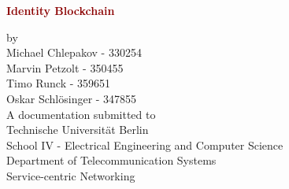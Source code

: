\begin{titlepage}
	\strut
	\hfill
	\begin{center}
	\vspace{1cm}
		\Huge
		\begin{spacing}{.9}
			\textcolor{DarkRed}{\textbf{Identity Blockchain}}\\
		\end{spacing}
		\vspace{0.8cm}
		\large
		by\\
		\vspace{0.8cm}
		Michael Chlepakov - 330254 \\
		Marvin Petzolt - 350455 \\
		Timo Runck - 359651 \\
		Oskar Schl{\"o}singer - 347855 \\
		\vspace{2cm}
	 	A documentation submitted to\\
		\vspace{0.5cm}
		Technische Universität Berlin\\
		School IV - Electrical Engineering and Computer Science\\
		Department of Telecommunication Systems\\
		Service-centric Networking\\
		\vspace{0.5cm}

\end{center}
\end{titlepage}
